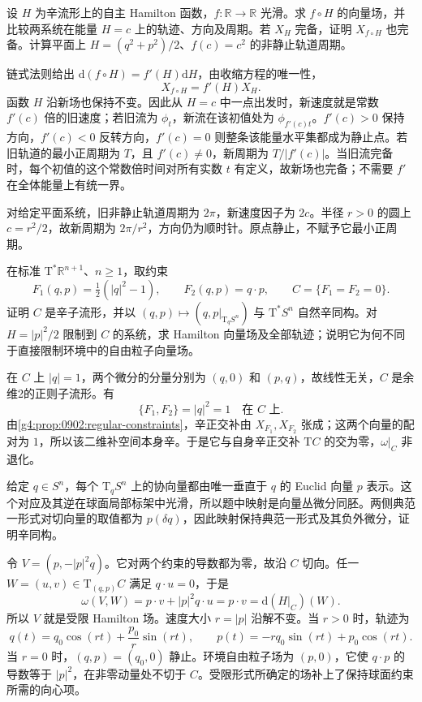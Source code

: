 \begin{exercise}\label{g4:ex:0901:energy-time-change}
	设 \(H\) 为辛流形上的自主 Hamilton 函数，\(f:\mathbb R\to\mathbb R\) 光滑。求 \(f\circ H\) 的向量场，并比较两系统在能量 \(H=c\) 上的轨迹、方向及周期。若 \(X_H\) 完备，证明 \(X_{f\circ H}\) 也完备。计算平面上 \(H=(q^2+p^2)/2\)、\(f(c)=c^2\) 的非静止轨道周期。
\end{exercise}
\begin{solution}
	链式法则给出 \(\mathrm{d}(f\circ H)=f'(H)\mathrm{d}H\)，由收缩方程的唯一性，
	\[
		X_{f\circ H}=f'(H)X_H.
	\]
	函数 \(H\) 沿新场也保持不变。因此从 \(H=c\) 中一点出发时，新速度就是常数 \(f'(c)\) 倍的旧速度；若旧流为 \(\phi_t\)，新流在该初值处为 \(\phi_{f'(c)t}\)。\(f'(c)>0\) 保持方向，\(f'(c)<0\) 反转方向，\(f'(c)=0\) 则整条该能量水平集都成为静止点。若旧轨道的最小正周期为 \(T\)，且 \(f'(c)\ne0\)，新周期为 \(T/|f'(c)|\)。当旧流完备时，每个初值的这个常数倍时间对所有实数 \(t\) 有定义，故新场也完备；不需要 \(f'\) 在全体能量上有统一界。

	对给定平面系统，旧非静止轨道周期为 \(2\pi\)，新速度因子为 \(2c\)。半径 \(r>0\) 的圆上 \(c=r^2/2\)，故新周期为 \(2\pi/r^2\)，方向仍为顺时针。原点静止，不赋予它最小正周期。
\end{solution}

\begin{exercise}\label{g4:ex:0902:cotangent-sphere-constraint}
	在标准 \(\mathrm{T}^*\mathbb R^{n+1}\)、\(n\ge1\)，取约束
	\[
		F_1(q,p)=\tfrac12(|q|^2-1),\qquad F_2(q,p)=q\cdot p,
		\qquad C=\{F_1=F_2=0\}.
	\]
	证明 \(C\) 是辛子流形，并以 \((q,p)\mapsto(q,p|_{\mathrm{T}_qS^n})\) 与 \(\mathrm{T}^*S^n\) 自然辛同构。对 \(H=|p|^2/2\) 限制到 \(C\) 的系统，求 Hamilton 向量场及全部轨迹；说明它为何不同于直接限制环境中的自由粒子向量场。
\end{exercise}
\begin{solution}
	在 \(C\) 上 \(|q|=1\)，两个微分的分量分别为 \((q,0)\) 和 \((p,q)\)，故线性无关，\(C\) 是余维2的正则子流形。有
	\[
		\{F_1,F_2\}=|q|^2=1\quad\text{在 }C\text{ 上}.
	\]
	由\cref{g4:prop:0902:regular-constraints}，辛正交补由 \(X_{F_1},X_{F_2}\) 张成；这两个向量的配对为 \(1\)，所以该二维补空间本身辛。于是它与自身辛正交补 \(\mathrm{T}C\) 的交为零，\(\omega|_C\) 非退化。

	给定 \(q\in S^n\)，每个 \(\mathrm{T}_qS^n\) 上的协向量都由唯一垂直于 \(q\) 的 Euclid 向量 \(p\) 表示。这个对应及其逆在球面局部标架中光滑，所以题中映射是向量丛微分同胚。两侧典范一形式对切向量的取值都为 \(p(\delta q)\)，因此映射保持典范一形式及其负外微分，证明辛同构。

	令 \(V=(p,-|p|^2q)\)。它对两个约束的导数都为零，故沿 \(C\) 切向。任一 \(W=(u,v)\in\mathrm{T}_{(q,p)}C\) 满足 \(q\cdot u=0\)，于是
	\[
		\omega(V,W)=p\cdot v+|p|^2q\cdot u=p\cdot v=\mathrm{d}(H|_C)(W).
	\]
	所以 \(V\) 就是受限 Hamilton 场。速度大小 \(r=|p|\) 沿解不变。当 \(r>0\) 时，轨迹为
	\[
		q(t)=q_0\cos(rt)+\frac{p_0}{r}\sin(rt),\qquad
		p(t)=-r q_0\sin(rt)+p_0\cos(rt).
	\]
	当 \(r=0\) 时，\((q,p)=(q_0,0)\) 静止。环境自由粒子场为 \((p,0)\)，它使 \(q\cdot p\) 的导数等于 \(|p|^2\)，在非零动量处不切于 \(C\)。受限形式所确定的场补上了保持球面约束所需的向心项。
\end{solution}

